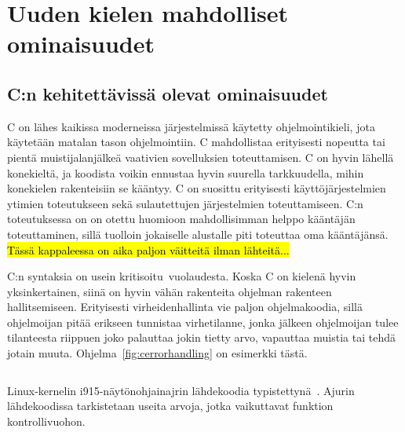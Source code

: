 \section{Uuden kielen mahdolliset ominaisuudet}

\subsection{C:n kehitettävissä olevat ominaisuudet}

C on lähes kaikissa moderneissa järjestelmissä käytetty ohjelmointikieli, jota
käytetään matalan tason ohjelmointiin. C mahdollistaa erityisesti nopeutta tai
pientä muistijalanjälkeä vaativien sovelluksien toteuttamisen. C on hyvin
lähellä konekieltä, ja koodista voikin ennustaa hyvin suurella tarkkuudella,
mihin konekielen rakenteisiin se kääntyy. C on suosittu erityisesti
käyttöjärjestelmien ytimien toteutukseen sekä sulautettujen järjestelmien
toteuttamiseen. C:n toteutuksessa on on otettu huomioon mahdollisimman helppo
kääntäjän toteuttaminen\citationneeded, sillä tuolloin jokaiselle alustalle
piti toteuttaa oma kääntäjänsä. \hl{Tässä kappaleessa on aika paljon väitteitä
ilman lähteitä...}

C:n syntaksia on usein kritisoitu\citationneeded~vuolaudesta. Koska C on
kielenä hyvin yksinkertainen, siinä on hyvin vähän rakenteita ohjelman
rakenteen hallitsemiseen. Erityisesti virheidenhallinta vie paljon
ohjelmakoodia, sillä ohjelmoijan pitää erikseen tunnistaa virhetilanne,
jonka jälkeen ohjelmoijan tulee tilanteesta riippuen joko palauttaa jokin
tietty arvo, vapauttaa muistia tai tehdä jotain muuta.
Ohjelma~\ref{fig:cerrorhandling} on esimerkki tästä.

\FloatBarrier

\begin{listing}[ht!]
    \inputminted{C}{c-error-handling.c}
    \caption{Linux-kernelin i915-näytönohjainajrin lähdekoodia
    typistettynä~\citep[\texttt{drivers/gpu/drm/i915/i915\_perf.c}, funktio
    \texttt{i915\_oa\_stream\_init}]{i915debugfs}. Ajurin lähdekoodissa
    tarkistetaan useita arvoja, jotka vaikuttavat funktion kontrollivuohon.}
    \label{fig:cerrorhandling}
\end{listing}


